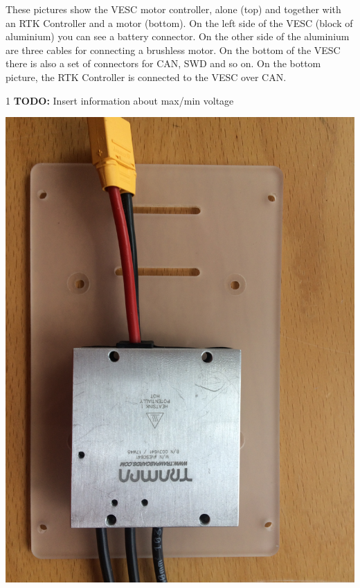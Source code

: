 \documentclass[12pt]{article} %
\def\printtodos{0}
\newcommand{\todo}[1]{
  \if\printtodos1
      {\color{red} \textbf{TODO:} #1}
  \fi}
\begin{document}
\vspace{5mm}

\noindent \begin{minipage}{0.66\textwidth} These pictures show the VESC
  motor controller, alone (top) and together with an RTK Controller
  and a motor (bottom). On the left side of the VESC (block of
  aluminium) you can see a battery connector.  On the other side of
  the aluminium are three cables for connecting a brushless motor.  On
  the bottom of the VESC there is also a set of connectors for CAN,
  SWD and so on. On the bottom picture, the RTK Controller is
  connected to the VESC over CAN.
  \todo{Insert information about max/min voltage} 
\end{minipage}
\begin{minipage}{0.33\textwidth} %
  \noindent \includegraphics[width=\textwidth]{./photos/VESC.JPG}

\end{minipage}
\end{document}
